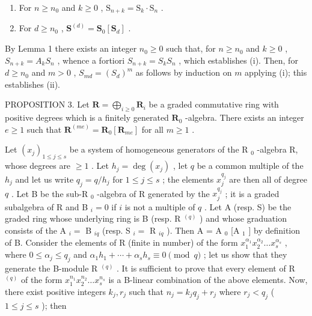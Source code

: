 \begin{enumerate}
\def\labelenumi{(\roman{enumi})}
\item
  For \(n \geqslant n_0\) and \(k \geqslant 0\) , \(\mathrm{S}_{n+k} = \mathrm{S}_k \cdot \mathrm{S}_n\) .
\item
  For \(d \geqslant n_0\) , \(\mathbf{S}^{(d)} = \mathbf{S}_0[\mathbf{S}_d]\) .
\end{enumerate}

By Lemma 1 there exists an integer \(n_0 \geqslant 0\) such that, for \(n \geqslant n_0\) and \(k \geqslant 0\) , \(S_{n+k} = A_kS_n\) , whence a fortiori \(S_{n+k} = S_kS_n\) , which establishes (i). Then, for \(d \geqslant n_0\) and \(m > 0\) , \(S_{md} = (S_d)^m\) as follows by induction on \(m\) applying (i); this establishes (ii).

PROPOSITION 3. Let \(\mathbf{R} = \bigoplus_{i\geqslant 0}\mathbf{R}_i\) be a graded commutative ring with positive degrees which is a finitely generated \(\mathbf{R}_0\) -algebra. There exists an integer \(e\geqslant 1\) such that \(\mathbf{R}^{(me)} = \mathbf{R}_0[\mathbf{R}_{me}]\) for all \(m\geqslant 1\) .

Let \((x_{j})_{1\leqslant j\leqslant s}\) be a system of homogeneous generators of the R \(_{0}\) -algebra R, whose degrees are \(\geqslant 1\) . Let \(h_{j} = \deg(x_{j})\) , let \(q\) be a common multiple of the \(h_{j}\) and let us write \(q_{j} = q/h_{j}\) for \(1 \leqslant j \leqslant s\) ; the elements \(x_{j}^{q_{j}}\) are then all of degree \(q\) . Let B be the sub-R \(_{0}\) -algebra of R generated by the \(x_{j}^{q_{j}}\) ; it is a graded subalgebra of R and B \(_{i} = 0\) if \(i\) is not a multiple of \(q\) . Let A (resp. S) be the graded ring whose underlying ring is B (resp. R \(^{(q)}\) ) and whose graduation consists of the A \(_{i} =\) B \(_{iq}\) (resp. S \(_{i} =\) R \(_{iq}\) ). Then A = A \(_{0}\) {[}A \(_{1}\) {]} by definition of B. Consider the elements of R (finite in number) of the form \(x_{1}^{\alpha_{1}}x_{2}^{\alpha_{2}}\ldots x_{s}^{\alpha_{s}}\) , where \(0 \leqslant \alpha_{j} \leqslant q_{j}\) and \(\alpha_{1}h_{1} + \cdots + \alpha_{s}h_{s} \equiv 0 \pmod{q}\) ; let us show that they generate the B-module R \(^{(q)}\) . It is sufficient to prove that every element of R \(^{(q)}\) of the form \(x_{1}^{n_{1}}x_{2}^{n_{2}}\ldots x_{s}^{n_{s}}\) is a B-linear combination of the above elements. Now, there exist positive integers \(k_{j}, r_{j}\) such that \(n_{j} = k_{j}q_{j} + r_{j}\) where \(r_{j} < q_{j}\) ( \(1 \leqslant j \leqslant s\) ); then

